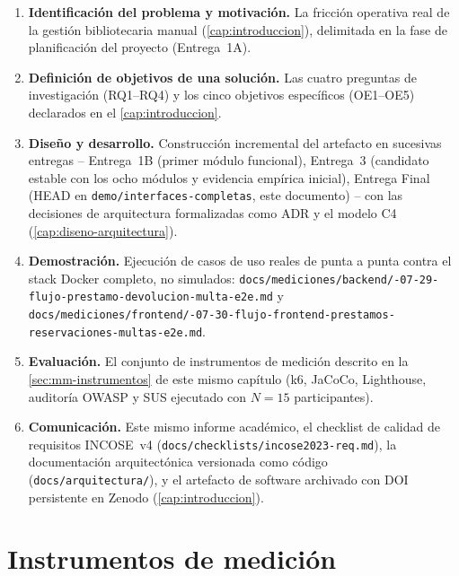 \begin{enumerate}[leftmargin=1.4cm]
  \item \textbf{Identificación del problema y motivación.} La fricción
    operativa real de la gestión bibliotecaria manual
    (\autoref{cap:introduccion}), delimitada en la fase de planificación
    del proyecto (Entrega~1A).
  \item \textbf{Definición de objetivos de una solución.} Las cuatro
    preguntas de investigación (RQ1--RQ4) y los cinco objetivos
    específicos (OE1--OE5) declarados en el \autoref{cap:introduccion}.
  \item \textbf{Diseño y desarrollo.} Construcción incremental del
    artefacto en sucesivas entregas -- Entrega~1B (primer módulo
    funcional), Entrega~3 (candidato estable con los ocho módulos y
    evidencia empírica inicial), Entrega Final (HEAD en \texttt{demo/interfaces-completas}, este
    documento) -- con las decisiones de arquitectura formalizadas como
    ADR y el modelo C4 (\autoref{cap:diseno-arquitectura}).
  \item \textbf{Demostración.} Ejecución de casos de uso reales de punta
    a punta contra el stack Docker completo, no simulados:
    \texttt{docs/\allowbreak mediciones/\allowbreak backend/-07-29-flujo-prestamo-devolucion-multa-e2e.md}
    y
    \texttt{docs/\allowbreak mediciones/\allowbreak frontend/-07-30-flujo-\allowbreak frontend-\allowbreak prestamos-\allowbreak reservaciones-\allowbreak multas-e2e.md}.
  \item \textbf{Evaluación.} El conjunto de instrumentos de medición
    descrito en la \autoref{sec:mm-instrumentos} de este mismo capítulo
    (k6, JaCoCo, Lighthouse, auditoría OWASP y SUS ejecutado con
    $N=15$ participantes).
  \item \textbf{Comunicación.} Este mismo informe académico, el checklist
    de calidad de requisitos INCOSE~v4
    (\texttt{docs/checklists/incose2023-req.md}), la documentación
    arquitectónica versionada como código (\texttt{docs/arquitectura/}),
    y el artefacto de software archivado con DOI persistente en Zenodo
    (\autoref{cap:introduccion}).
\end{enumerate}

\section{Instrumentos de medición}
\label{sec:mm-instrumentos}

